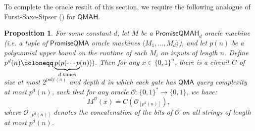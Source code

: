 \documentclass[10pt,a4paper]{article}
\newtheorem{proposition}[theorem]{Proposition}
\newcommand{\poly}{\mathrm{poly}}
\begin{document}
To complete the oracle result of this section, we require the following analogue of Furst-Saxe-Sipser \cite{FSS84} () for $\mathsf{QMAH}$.

\begin{proposition}
\label{prop:qmah_fss}
For some constant $d$, let $M$ be a $\mathsf{PromiseQMAH}_d$ oracle machine (i.e. a tuple of $\mathsf{PromiseQMA}$ oracle machines $\langle M_1, \ldots, M_d \rangle$), and let $p(n)$ be a polynomial upper bound on the runtime of each $M_i$ on inputs of length $n$. Define $p^d(n) \coloneqq \underbrace{p(p( \cdots p}_{d \text{\rm \ times}}(n)))$. Then for any $x \in \{0,1\}^n$, there is a circuit $C$ of size at most $2^{\poly(n)}$ and depth $d$ in which each gate has $\mathsf{QMA}$ query complexity at most $p^d(n)$, such that for any oracle $\mathcal{O}: \{0,1\}^* \to \{0,1\}$, we have:
\[
M^\mathcal{O}(x) = C\left(\mathcal{O}_{[p^d(n)]}\right),
\]
where $\mathcal{O}_{[p^d(n)]}$ denotes the concatenation of the bits of $\mathcal{O}$ on all strings of length at most $p^d(n)$.
\end{proposition}
\end{document}
